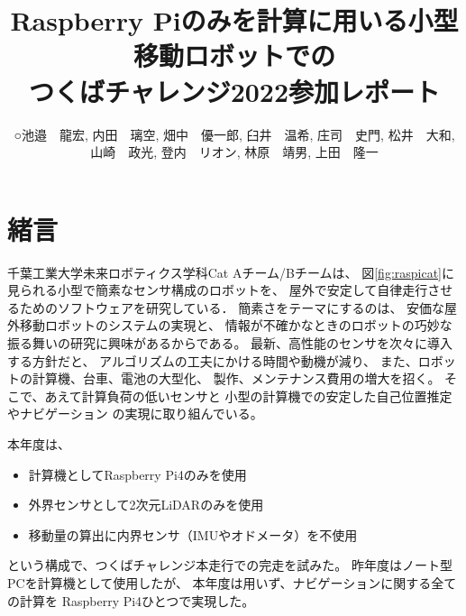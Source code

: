 \documentclass[twocolumn,9pt]{jsproceedings}
\title{Raspberry Piのみを計算に用いる小型移動ロボットでの\\つくばチャレンジ2022参加レポート}
\author{○池邉　龍宏\authorrefmark{1}, 内田　璃空\authorrefmark{1}, 畑中　優一郎\authorrefmark{1}, 臼井　温希\authorrefmark{1}, 庄司　史門\authorrefmark{1}, 松井　大和\authorrefmark{1}, \\
山崎　政光\authorrefmark{1}, 登内　リオン\authorrefmark{1}, 林原　靖男\authorrefmark{1}, 上田　隆一\authorrefmark{1}}
\affiliation{千葉工業大学 未来ロボティクス学科 Cat Aチーム}
\begin{document}
\maketitle



\section{緒言}

千葉工業大学未来ロボティクス学科Cat Aチーム/Bチームは、
図\ref{fig:raspicat}に見られる小型で簡素なセンサ構成のロボットを、
屋外で安定して自律走行させるためのソフトウェアを研究している．
簡素さをテーマにするのは、
安価な屋外移動ロボットのシステムの実現と、
情報が不確かなときのロボットの巧妙な振る舞いの研究に興味があるからである。
最新、高性能のセンサを次々に導入する方針だと、
アルゴリズムの工夫にかける時間や動機が減り、
また、ロボットの計算機、台車、電池の大型化、
製作、メンテナンス費用の増大を招く。
そこで、あえて計算負荷の低いセンサと
小型の計算機での安定した自己位置推定やナビゲーション
の実現に取り組んでいる。


本年度は、
\begin{itemize}
\item 計算機としてRaspberry Pi4のみを使用
\item 外界センサとして2次元LiDARのみを使用
\item 移動量の算出に内界センサ（IMUやオドメータ）を不使用
\end{itemize}
という構成で、つくばチャレンジ本走行での完走を試みた。
昨年度はノート型PCを計算機として使用したが、
本年度は用いず、ナビゲーションに関する全ての計算を
Raspberry Pi4ひとつで実現した。
\end{document}
